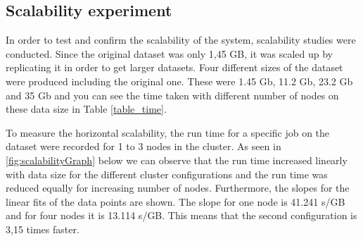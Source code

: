 




\subsection{Scalability experiment}
In order to test and confirm the scalability of the system, scalability studies were conducted. Since the original dataset was only 1,45 GB, it was scaled up by replicating it in order to get larger datasets. Four different sizes of the dataset were produced including the original one. These were 1.45 Gb, 11.2 Gb, 23.2 Gb and 35 Gb and you can see the time taken with different number of nodes on these data size in Table \ref{table_time}.

To measure the horizontal scalability, the run time for a specific job on the dataset were recorded for 1 to 3 nodes in the cluster. As seen in  \ref{fig:scalabilityGraph} below we can observe that
the run time increased linearly with data size for the different cluster configurations and the run time was reduced equally for increasing number of nodes. Furthermore, the slopes for the linear fits of the data points are shown. The slope for one node is 41.241 s/GB and for four nodes it is 13.114 s/GB. This means that the second configuration is 3,15 times faster.\\

